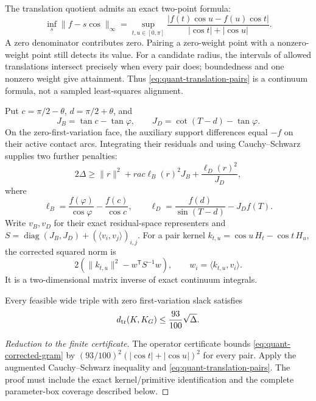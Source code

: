 The translation quotient admits an exact two-point formula:
\begin{equation}\label{eq:quant-translation-pairs}
 \inf_s\|f-s\cos\|_\infty
 =\sup_{t,u\in[0,\pi]}
 \frac{|f(t)\cos u-f(u)\cos t|}{|\cos t|+|\cos u|}.
\end{equation}
A zero denominator contributes zero. Pairing a zero-weight point with a
nonzero-weight point still detects its value. For a candidate radius, the
intervals of allowed translations intersect precisely when every pair does;
boundedness and one nonzero weight give attainment. Thus
\cref{eq:quant-translation-pairs} is a continuum formula, not a sampled
least-squares alignment.

Put $c=\pi/2-\theta$, $d=\pi/2+\theta$, and
\[
 J_B=\tan c-\tan\varphi,\qquad
 J_D=\cot(T-d)-\tan\varphi.
\]
On the zero-first-variation face, the auxiliary support differences equal
$-f$ on their active contact arcs. Integrating their residuals and using
Cauchy--Schwarz supplies two further penalties:
\[
 2\Delta\ge \|r\|^2+rac{\ell_B(r)^2}{J_B}
                       +\frac{\ell_D(r)^2}{J_D},
\]
where
\[
 \ell_B=\frac{f(\varphi)}{\cos\varphi}-\frac{f(c)}{\cos c},\qquad
 \ell_D=\frac{f(d)}{\sin(T-d)}-J_Df(T).
\]
Write $v_B,v_D$ for their exact residual-space representers and
$S=\operatorname{diag}(J_B,J_D)+(\langle v_i,v_j\rangle)_{i,j}$.
For a pair kernel $k_{t,u}=\cos u\,H_t-\cos t\,H_u$, the corrected squared
norm is
\begin{equation}\label{eq:quant-corrected-gram}
 2\left(\|k_{t,u}\|^2-w^{\mathsf T}S^{-1}w\right),
 \qquad w_i=\langle k_{t,u},v_i\rangle.
\end{equation}
It is a two-dimensional matrix inverse of exact continuum integrals.

\begin{theorem}
\label{thm:quant-critical-face}
Every feasible wide triple with zero first-variation slack satisfies
\[
 d_{\rm tr}(K,K_G)\le\frac{93}{100}\sqrt\Delta.
\]
\end{theorem}
\begin{proof}[Reduction to the finite certificate]
The operator certificate bounds \cref{eq:quant-corrected-gram} by
$(93/100)^2(|\cos t|+|\cos u|)^2$ for every pair. Apply the augmented
Cauchy--Schwarz inequality and \cref{eq:quant-translation-pairs}.
The proof must include the exact kernel/primitive identification and the
complete parameter-box coverage described below.
\end{proof}

